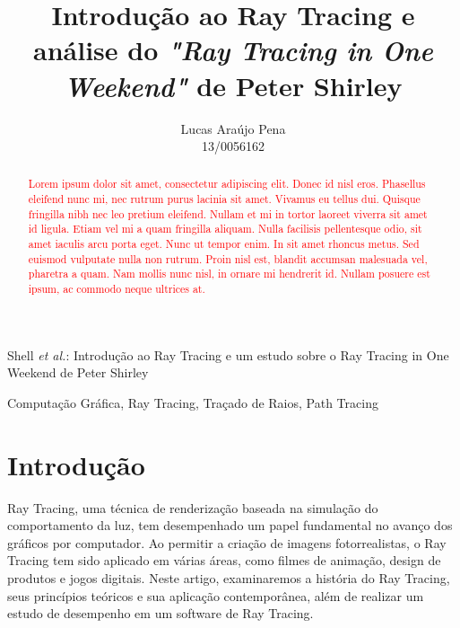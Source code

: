 \documentclass[journal]{IEEEtran}
\begin{document}
\title{Introdução ao Ray Tracing e análise do \emph{"Ray Tracing in One Weekend"} de Peter Shirley}

\author{ Lucas Araújo Pena \\ 
         13/0056162 }

%
{Shell \MakeLowercase{\textit{et al.}}: Introdução ao Ray Tracing e um estudo sobre o Ray Tracing in One Weekend de Peter Shirley}

\maketitle

\begin{abstract}
  \textcolor{red}{
    Lorem ipsum dolor sit amet, consectetur adipiscing elit. Donec id nisl eros. 
    Phasellus eleifend nunc mi, nec rutrum purus lacinia sit amet. Vivamus eu 
    tellus dui. Quisque fringilla nibh nec leo pretium eleifend. Nullam et mi in 
    tortor laoreet viverra sit amet id ligula. Etiam vel mi a quam fringilla 
    aliquam. Nulla facilisis pellentesque odio, sit amet iaculis arcu porta 
    eget. Nunc ut tempor enim. In sit amet rhoncus metus. Sed euismod vulputate 
    nulla non rutrum. Proin nisl est, blandit accumsan malesuada vel, pharetra a 
    quam. Nam mollis nunc nisl, in ornare mi hendrerit id. Nullam posuere est 
    ipsum, ac commodo neque ultrices at.
  }
\end{abstract}


\begin{IEEEkeywords}
Computação Gráfica, Ray Tracing, Traçado de Raios, Path Tracing
\end{IEEEkeywords}

\section{Introdução}

 Ray Tracing, uma técnica de renderização baseada na simulação do 
comportamento da luz, tem desempenhado um papel fundamental no avanço
dos gráficos por computador. Ao permitir a criação de imagens fotorrealistas, 
o Ray Tracing tem sido aplicado em várias áreas, como filmes de animação,
design de produtos e jogos digitais. Neste artigo, examinaremos a história 
do Ray Tracing, seus princípios teóricos e sua aplicação contemporânea, além 
de realizar um estudo de desempenho em um software de Ray Tracing. 
\end{document}
